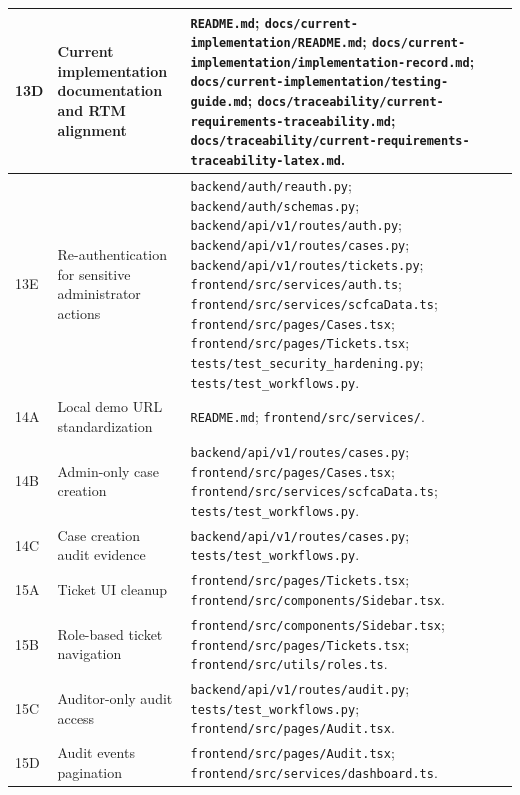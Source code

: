 \documentclass[12pt,a4paper]{report}
\begin{document}
\begin{longtable}{|p{1.5cm}|p{4.8cm}|p{9.8cm}|}
13D & Current implementation documentation and RTM alignment &
\texttt{README.md}; \texttt{docs/current-implementation/README.md}; \texttt{docs/current-implementation/implementation-record.md}; \texttt{docs/current-implementation/testing-guide.md}; \texttt{docs/traceability/current-requirements-traceability.md}; \texttt{docs/traceability/current-requirements-traceability-latex.md}. \\
\hline

13E & Re-authentication for sensitive administrator actions &
\texttt{backend/auth/reauth.py}; \texttt{backend/auth/schemas.py}; \texttt{backend/api/v1/routes/auth.py}; \texttt{backend/api/v1/routes/cases.py}; \texttt{backend/api/v1/routes/tickets.py}; \texttt{frontend/src/services/auth.ts}; \texttt{frontend/src/services/scfcaData.ts}; \texttt{frontend/src/pages/Cases.tsx}; \texttt{frontend/src/pages/Tickets.tsx}; \texttt{tests/test\_security\_hardening.py}; \texttt{tests/test\_workflows.py}. \\
\hline

14A & Local demo URL standardization &
\texttt{README.md}; \texttt{frontend/src/services/}. \\
\hline

14B & Admin-only case creation &
\texttt{backend/api/v1/routes/cases.py}; \texttt{frontend/src/pages/Cases.tsx}; \texttt{frontend/src/services/scfcaData.ts}; \texttt{tests/test\_workflows.py}. \\
\hline

14C & Case creation audit evidence &
\texttt{backend/api/v1/routes/cases.py}; \texttt{tests/test\_workflows.py}. \\
\hline

15A & Ticket UI cleanup &
\texttt{frontend/src/pages/Tickets.tsx}; \texttt{frontend/src/components/Sidebar.tsx}. \\
\hline

15B & Role-based ticket navigation &
\texttt{frontend/src/components/Sidebar.tsx}; \texttt{frontend/src/pages/Tickets.tsx}; \texttt{frontend/src/utils/roles.ts}. \\
\hline

15C & Auditor-only audit access &
\texttt{backend/api/v1/routes/audit.py}; \texttt{tests/test\_workflows.py}; \texttt{frontend/src/pages/Audit.tsx}. \\
\hline

15D & Audit events pagination &
\texttt{frontend/src/pages/Audit.tsx}; \texttt{frontend/src/services/dashboard.ts}. \\
\hline


\end{longtable}
\end{document}
